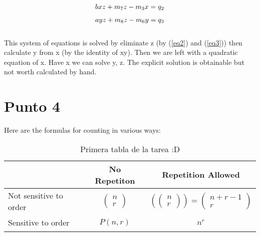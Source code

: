 \documentclass[10pt,onecolumn,letterpaper]{article}
\begin{document}
\begin{equation}\label{eq2}
bxz+m_7z-m_3x=q_2\\
\end{equation}

\begin{equation}\label{eq3}
ayz+m_8z-m_6y=q_3\\
\end{equation}
\\
This system of equations is solved by eliminate z (by (\ref{eq2}) and (\ref{eq3})) then calculate y from x (by the identity of
xy). Then we are left with a quadratic equation of x.\newline
Have x we can solve y, z.\newline
The explicit solution is obtainable but not worth calculated by hand.
\newpage
\section{Punto 4}
Here are the formulas for counting in various ways:
\begin{table}[h!]
\begin{center}
\begin{tabular}{|l||c|c|}
    \hline
     &No Repetiton&Repetition Allowed \\ \hline \hline
    \multirow{3}{*}{Not sensitive to order}& & \\
    &$\left(\begin{array}{c}
     n\\
     r
\end{array}\right)$&$\left(\left(\begin{array}{c}
     n\\
     r
\end{array}\right)\right)=\left(\begin{array}{c}
     n+r-1\\
     r
\end{array}\right)$\\
    & & \\\hline
        \multirow{3}{*}{Sensitive to order}& & \\
    &$P(n,r)$&$n^{r}$\\
    & & \\
    \hline
\end{tabular}\caption{Primera tabla de la tarea :D}
\end{center}
\label{tab:multicol}
\end{table}\\
\end{document}
